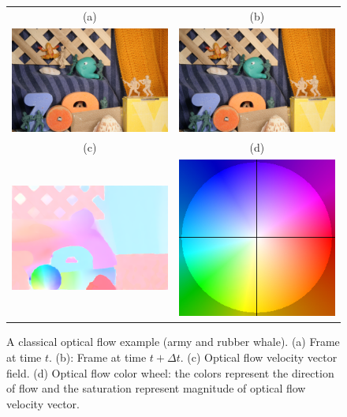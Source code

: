 \documentclass[letterpaper,11pt]{article}
\begin{document}
\begin{figure}[hbt!]
	\centering
	\begin{tabular}{cc} 
		(a) & (b) \\
		\includegraphics[width=.45\textwidth]{grf/army1.png} &
		\includegraphics[width=.45\textwidth]{grf/army2.png} \vspace{1cm}\\ 
		(c) & (d) \\
		\includegraphics[width=.45\textwidth]{grf/army-flow.png} &
		\includegraphics[width=.2\textwidth]{grf/colorwheel.png} 
	\end{tabular}
	\caption{A classical optical flow example (army and rubber whale). (a) Frame at time $t$. (b): Frame at time $t+\Delta t$. (c) Optical flow velocity vector field. (d) Optical flow color wheel: the colors represent the direction of flow and the saturation represent magnitude of optical flow velocity vector.}
	\label{grf:army-flow}
\end{figure}
\end{document}
